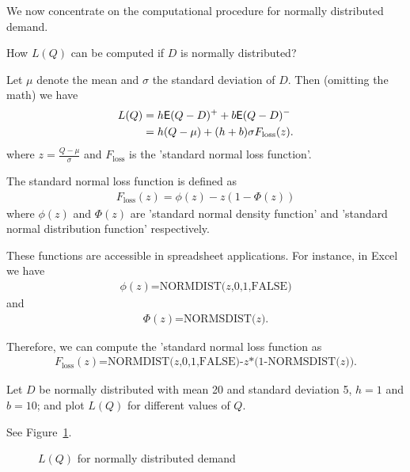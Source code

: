 We now concentrate on the computational procedure for normally distributed demand. 

\begin{question}
How $L(Q)$ can be computed if $D$ is normally distributed?
\end{question}

\begin{solution}
Let $\mu$ denote the mean and $\sigma$ the standard deviation of $D$. Then (omitting the math) we have
\begin{align*}
L(Q) 
& = h \mathsf{E} (Q-D)^+ + b \mathsf{E} (Q-D)^- \\
& = h(Q-\mu) + (h+b) \sigma F_{\text{loss}}(z).
\end{align*}
where $z=\frac{Q-\mu}{\sigma}$ and $F_{\text{loss}}$ is the 'standard normal loss function'. 

The standard normal loss function is defined as 
\begin{align*}
F_{\text{loss}}(z) = \phi(z)-z(1-\Phi(z))
\end{align*}
where $\phi(z)$ and $\Phi(z)$ are 'standard normal density function' and 'standard normal distribution function' respectively. 

These functions are accessible in spreadsheet applications. For instance, in Excel we have 
\begin{align*}
\phi(z) \text{=NORMDIST($z$,0,1,FALSE)}
\end{align*}
and
\begin{align*}
\Phi(z) \text{=NORMSDIST($z$)}.
\end{align*}

Therefore, we can compute the 'standard normal loss function as
\begin{align*}
F_{\text{loss}}(z) \text{=NORMDIST($z$,0,1,FALSE)-$z$*(1-NORMSDIST($z$))}.
\end{align*}
\end{solution}

\begin{question}\label{ex:nw_stoc}
Let $D$ be normally distributed with mean 20 and standard deviation 5, $h=1$ and $b=10$; and plot $L(Q)$ for different values of $Q$. 
\end{question}

\begin{solution}
See Figure~\ref{fig:LQ_normal}.

\begin{figure}[htbp]
\centering
{}
\caption{$L(Q)$ for normally distributed demand}
\label{fig:LQ_normal}
\end{figure}
\end{solution}


